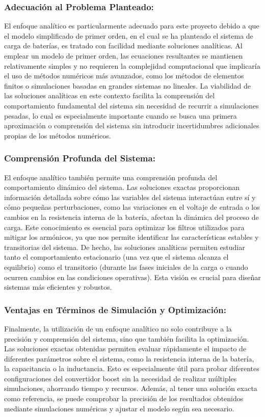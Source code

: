 \subsubsection*{Adecuación al Problema Planteado:}
El enfoque analítico es particularmente adecuado para este proyecto debido a que el modelo
simplificado de primer orden, en el cual se ha planteado el sistema de carga de baterías, es
tratado con facilidad mediante soluciones analíticas. Al emplear un modelo de primer orden,
las ecuaciones resultantes se mantienen relativamente simples y no requieren la complejidad
computacional que implicaría el uso de métodos numéricos más avanzados, como los
métodos de elementos finitos o simulaciones basadas en grandes sistemas no lineales. La
viabilidad de las soluciones analíticas en este contexto facilita la comprensión del
comportamiento fundamental del sistema sin necesidad de recurrir a simulaciones pesadas, lo
cual es especialmente importante cuando se busca una primera aproximación o comprensión
del sistema sin introducir incertidumbres adicionales propias de los métodos numéricos.

\subsubsection*{Comprensión Profunda del Sistema:}
El enfoque analítico también permite una comprensión profunda del comportamiento
dinámico del sistema. Las soluciones exactas proporcionan información detallada sobre cómo
las variables del sistema interactúan entre sí y cómo pequeñas perturbaciones, como las
variaciones en el voltaje de entrada o los cambios en la resistencia interna de la batería,
afectan la dinámica del proceso de carga. Este conocimiento es esencial para optimizar los
filtros utilizados para mitigar los armónicos, ya que nos permite identificar las características
estables y transitorias del sistema. De hecho, las soluciones analíticas permiten estudiar tanto
el comportamiento estacionario (una vez que el sistema alcanza el equilibrio) como el
transitorio (durante las fases iniciales de la carga o cuando ocurren cambios en las
condiciones operativas). Esta visión es crucial para diseñar sistemas más eficientes y robustos.

\subsubsection*{Ventajas en Términos de Simulación y Optimización:}
Finalmente, la utilización de un enfoque analítico no solo contribuye a la precisión y
comprensión del sistema, sino que también facilita la optimización. Las soluciones exactas
obtenidas permiten evaluar rápidamente el impacto de diferentes parámetros sobre el sistema,
como la resistencia interna de la batería, la capacitancia o la inductancia. Esto es
especialmente útil para probar diferentes configuraciones del convertidor boost sin la
necesidad de realizar múltiples simulaciones, ahorrando tiempo y recursos. Además, al tener
una solución exacta como referencia, se puede comprobar la precisión de los resultados
obtenidos mediante simulaciones numéricas y ajustar el modelo según sea necesario.

